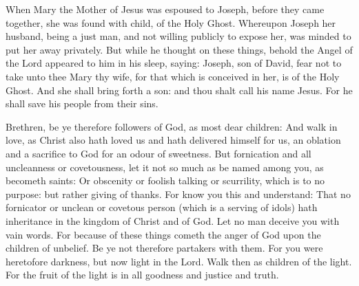 \begin{multicols}{2}


When Mary the Mother of Jesus was
espoused to Joseph, before they came together, she was found with child, of the
Holy Ghost.  Whereupon Joseph her husband, being a just man, and not willing
publicly to expose her, was minded to put her away privately.  But while he
thought on these things, behold the Angel of the Lord appeared to him in his
sleep, saying: Joseph, son of David, fear not to take unto thee Mary thy wife,
for that which is conceived in her, is of the Holy Ghost.  And she shall bring
forth a son: and thou shalt call his name Jesus. For he shall save his people
from their sins.


\bigskip



Brethren, be ye therefore followers of God, as most dear children: And walk in love, as
Christ also hath loved us and hath delivered himself for us, an oblation and a
sacrifice to God for an odour of sweetness.  But fornication and all
uncleanness or covetousness, let it not so much as be named among you, as
becometh saints: Or obscenity or foolish talking or scurrility, which is to no
purpose: but rather giving of thanks.  For know you this and understand: That
no fornicator or unclean or covetous person (which is a serving of idols) hath
inheritance in the kingdom of Christ and of God.  Let no man deceive you with
vain words. For because of these things cometh the anger of God upon the
children of unbelief.  Be ye not therefore partakers with them.  For you were
heretofore darkness, but now light in the Lord.  Walk then as children of the
light.  For the fruit of the light is in all goodness and justice and truth.





\end{multicols}
